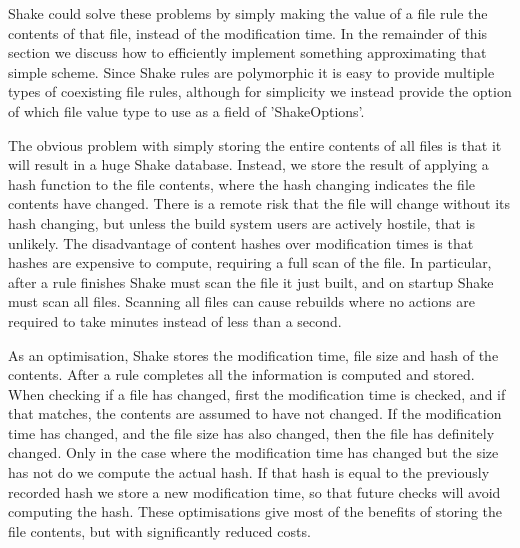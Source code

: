 Shake could solve these problems by simply making the value of a file rule the contents of that file, instead of the modification time. In the remainder of this section we discuss how to efficiently implement something approximating that simple scheme. Since Shake rules are polymorphic it is easy to provide multiple types of coexisting file rules, although for simplicity we instead provide the option of which file value type to use as a field of \lst'ShakeOptions'.

The obvious problem with simply storing the entire contents of all files is that it will result in a huge Shake database. Instead, we store the result of applying a hash function to the file contents, where the hash changing indicates the file contents have changed. There is a remote risk that the file will change without its hash changing, but unless the build system users are actively hostile, that is unlikely. The disadvantage of content hashes over modification times is that hashes are expensive to compute, requiring a full scan of the file. In particular, after a rule finishes Shake must scan the file it just built, and on startup Shake must scan all files. Scanning all files can cause rebuilds where no actions are required to take minutes instead of less than a second.

As an optimisation, Shake stores the modification time, file size and hash of the contents. After a rule completes all the information is computed and stored. When checking if a file has changed, first the modification time is checked, and if that matches, the contents are assumed to have not changed. If the modification time has changed, and the file size has also changed, then the file has definitely changed. Only in the case where the modification time has changed but the size has not do we compute the actual hash. If that hash is equal to the previously recorded hash we store a new modification time, so that future checks will avoid computing the hash. These optimisations give most of the benefits of storing the file contents, but with significantly reduced costs.
